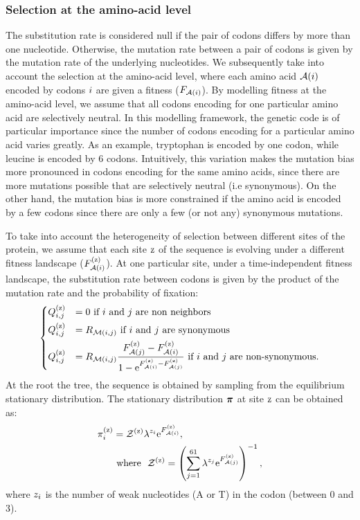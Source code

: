 \subsubsection{Selection at the amino-acid level}
\label{sec:mut-bias-aa-selection}
The substitution rate is considered null if the pair of codons differs by more than one nucleotide.
Otherwise, the mutation rate between a pair of codons is given by the mutation rate of the underlying nucleotides.
We subsequently take into account the selection at the amino-acid level, where each amino acid $\mathcal{A}({i})$ encoded by codons ${i}$ are given a fitness ($F_{\mathcal{A}({i})}$).
By modelling fitness at the amino-acid level, we assume that all codons encoding for one particular amino acid are selectively neutral.
In this modelling framework, the genetic code is of particular importance since the number of codons encoding for a particular amino acid varies greatly.
As an example, tryptophan is encoded by one codon, while leucine is encoded by 6 codons.
Intuitively, this variation makes the mutation bias more pronounced in codons encoding for the same amino acids, since there are more mutations possible that are selectively neutral (i.e synonymous).
On the other hand, the mutation bias is more constrained if the amino acid is encoded by a few codons since there are only a few (or not any) synonymous mutations.

To take into account the heterogeneity of selection between different sites of the protein, we assume that each site $\text{z}$ of the sequence is evolving under a different fitness landscape ($F_{\mathcal{A}({i})}^{(\text{z})}$).
At one particular site, under a time-independent fitness landscape, the substitution rate between codons is given by the product of the mutation rate and the probability of fixation:
\begin{equation}
    \begin{dcases}
        Q_{{i}, {j}}^{(\text{z})} & = 0 \text{ if ${i}$ and ${j}$ are non neighbors} \\
        Q_{{i}, {j}}^{(\text{z})} & = R_{\mathcal{M}({i}, {j})} \text{ if ${i}$ and ${j}$ are synonymous} \\
        Q_{{i}, {j}}^{(\text{z})} & = R_{\mathcal{M}({i}, {j})} \dfrac{F_{\mathcal{A}({j})}^{(\text{z})} - F_{\mathcal{A}({i})}^{(\text{z})}}{1 - \text{e}^{F_{\mathcal{A}({i})}^{(\text{z})} - F_{\mathcal{A}({j})}^{(\text{z})}} } \text{ if ${i}$ and ${j}$ are non-synonymous}.
    \end{dcases}
    \label{eq:codonsubrates}
\end{equation}
At the root the tree, the sequence is obtained by sampling from the equilibrium stationary distribution.
The stationary distribution $\bm{\pi}$ at site $\text{z}$ can be obtained as:
\begin{align}
    \pi_{{i}}^{(\text{z})} & = \mathcal{Z}^{(\text{z})} \lambda^{{z}_{{i}}} \text{e}^{F_{\mathcal{A}({i})}^{(\text{z})}},\\
    & \text{ where } \ \mathcal{Z}^{(\text{z})} = \left( \sum\limits_{{j}=1}^{61} \lambda^{{z}_{{j}}} \text{e}^{F_{\mathcal{A}({j})}^{(\text{z})}} \right)^{-1},
    \label{codonStationarity}
\end{align}
where ${z}_{{i}}$ is the number of weak nucleotides (A or T) in the codon (between 0 and 3).

